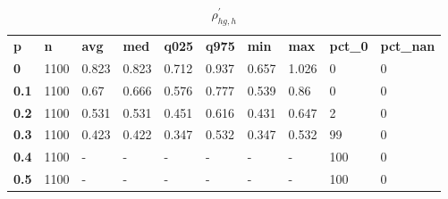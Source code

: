 \begin{table}[h]
 \centering 
\footnotesize
\caption{$\rho_{hg,h}^\prime $}
\label{tab:alphahgh}
\begin{tabular}[h]{| l l l l l l l l l l|
    } \hline
\textbf{ p} & \textbf{ n} & \textbf{ avg} & \textbf{ med} & \textbf{ q025} & \textbf{ q975} & \textbf{ min} & \textbf{ max} & \textbf{ pct\_0} & \textbf{ pct\_nan}
           \\
  \textbf{  0} & 1100 & 0.823 & 0.823 & 0.712 & 0.937 & 0.657 & 1.026 &   0 & 0
           \\
  \textbf{0.1} & 1100 &  0.67 & 0.666 & 0.576 & 0.777 & 0.539 &  0.86 &   0 & 0
           \\
  \textbf{0.2} & 1100 & 0.531 & 0.531 & 0.451 & 0.616 & 0.431 & 0.647 &   2 & 0
           \\
  \textbf{0.3} & 1100 & 0.423 & 0.422 & 0.347 & 0.532 & 0.347 & 0.532 &  99 & 0
           \\
  \textbf{0.4} & 1100 & - & - & - & - & - & - & 100 & 0
           \\
  \textbf{0.5} & 1100 & - & - & - & - & - & - & 100 & 0
           \\
 \hline \end{tabular}
 \end{table}

